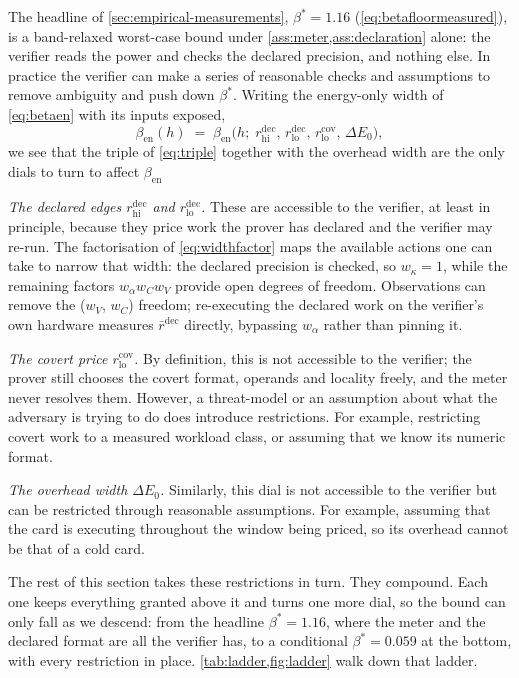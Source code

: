 \documentclass{article}
\theoremstyle{plain}
\theoremstyle{definition}
\theoremstyle{remark}
\begin{document}
The headline of \cref{sec:empirical-measurements}, $\beta^{*} = 1.16$
(\cref{eq:betafloormeasured}), is a band-relaxed worst-case bound under
\cref{ass:meter,ass:declaration} alone: the verifier reads the power and
checks the declared precision, and nothing else. In practice the verifier can
make a series of reasonable checks and assumptions to remove ambiguity and push
down $\beta^{*}$. Writing the
energy-only width of \cref{eq:betaen} with its inputs exposed,
\begin{equation}
	\beta_{\mathrm{en}}(h) \;=\;
	\beta_{\mathrm{en}}\bigl(h;\;
	r_{\mathrm{hi}}^{\mathrm{dec}},\,
	r_{\mathrm{lo}}^{\mathrm{dec}},\,
	r_{\mathrm{lo}}^{\mathrm{cov}},\,
	\Delta E_0\bigr),
	\label{eq:betadials}
\end{equation}
we see that the triple of \cref{eq:triple} together with the overhead width are the only
dials to turn to affect $\beta_{\mathrm{en}}$

\emph{The declared edges $r_{\mathrm{hi}}^{\mathrm{dec}}$ and
$r_{\mathrm{lo}}^{\mathrm{dec}}$.} These are accessible to the verifier, at
least in principle, because they price work the prover has declared and the
verifier may re-run. The factorisation of \cref{eq:widthfactor} maps the available actions one can take to narrow that width: the declared precision is checked,
so $w_\kappa = 1$, while the remaining factors $w_\alpha w_C w_V$ provide open degrees of
freedom. Observations can remove the ($w_V$, $w_C$) freedom;
re-executing the declared work on the verifier's own hardware measures
$\bar r^{\mathrm{dec}}$ directly, bypassing $w_\alpha$ rather than pinning it.

\emph{The covert price $r_{\mathrm{lo}}^{\mathrm{cov}}$.} By definition, this is not accessible to the verifier; the prover still chooses the covert format, operands and locality freely,
and the meter never resolves them. However, a threat-model or an assumption about what the
adversary is trying to do does introduce restrictions. For example,
restricting covert work to a measured workload class, or assuming that we know
its numeric format.

\emph{The overhead width $\Delta E_0$.} Similarly, this dial is not
accessible to the verifier but can be restricted through reasonable
assumptions. For example, assuming that the card is executing throughout the
window being priced, so its overhead cannot be that of a cold card.

The rest of this section takes these restrictions in turn. They compound. Each
one keeps everything granted above it and turns one more dial, so the bound can
only fall as we descend: from the headline $\beta^{*} = 1.16$, where the meter
and the declared format are all the verifier has, to a conditional
$\beta^{*} = 0.059$ at the bottom, with every restriction in place.
\cref{tab:ladder,fig:ladder} walk down that ladder.
\end{document}
